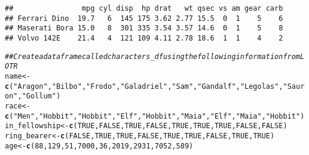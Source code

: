 \documentclass{article}\usepackage[]{graphicx}\usepackage[]{xcolor}
\makeatletter
\newcommand{\hlnum}[1]{\textcolor[rgb]{0.686,0.059,0.569}{#1}}%
\newcommand{\hlstr}[1]{\textcolor[rgb]{0.192,0.494,0.8}{#1}}%
\newcommand{\hlcom}[1]{\textcolor[rgb]{0.678,0.584,0.686}{\textit{#1}}}%
\newcommand{\hlstd}[1]{\textcolor[rgb]{0.345,0.345,0.345}{#1}}%
\newcommand{\hlkwb}[1]{\textcolor[rgb]{0.69,0.353,0.396}{#1}}%
\newcommand{\hlkwd}[1]{\textcolor[rgb]{0.737,0.353,0.396}{\textbf{#1}}}%
\newenvironment{kframe}{%
 \def\at@end@of@kframe{}%
 \ifinner\ifhmode%
  \def\at@end@of@kframe{\end{minipage}}%
  \begin{minipage}{\columnwidth}%
 \fi\fi%
 \def\FrameCommand##1{\hskip\@totalleftmargin \hskip-\fboxsep
 \colorbox{shadecolor}{##1}\hskip-\fboxsep
     \hskip-\linewidth \hskip-\@totalleftmargin \hskip\columnwidth}%
 \MakeFramed {\advance\hsize-\width
   \@totalleftmargin\z@ \linewidth\hsize
   \@setminipage}}%
 {\par\unskip\endMakeFramed%
 \at@end@of@kframe}
\newenvironment{knitrout}{}{} %
\makeatother
\begin{document}
\begin{knitrout}
\begin{kframe}
\begin{alltt}
\end{alltt}
\begin{verbatim}
##                mpg cyl disp  hp drat   wt qsec vs am gear carb
## Ferrari Dino  19.7   6  145 175 3.62 2.77 15.5  0  1    5    6
## Maserati Bora 15.0   8  301 335 3.54 3.57 14.6  0  1    5    8
## Volvo 142E    21.4   4  121 109 4.11 2.78 18.6  1  1    4    2
\end{verbatim}
\begin{alltt}
\hlcom{## Create a dataframe called characters_df using the following information from LOTR}
\hlstd{name} \hlkwb{<-} \hlkwd{c}\hlstd{(}\hlstr{"Aragon"}\hlstd{,} \hlstr{"Bilbo"}\hlstd{,} \hlstr{"Frodo"}\hlstd{,} \hlstr{"Galadriel"}\hlstd{,} \hlstr{"Sam"}\hlstd{,} \hlstr{"Gandalf"}\hlstd{,} \hlstr{"Legolas"}\hlstd{,} \hlstr{"Sauron"}\hlstd{,} \hlstr{"Gollum"}\hlstd{)}
\hlstd{race} \hlkwb{<-} \hlkwd{c}\hlstd{(}\hlstr{"Men"}\hlstd{,} \hlstr{"Hobbit"}\hlstd{,} \hlstr{"Hobbit"}\hlstd{,} \hlstr{"Elf"}\hlstd{,} \hlstr{"Hobbit"}\hlstd{,} \hlstr{"Maia"}\hlstd{,} \hlstr{"Elf"}\hlstd{,} \hlstr{"Maia"}\hlstd{,} \hlstr{"Hobbit"}\hlstd{)}
\hlstd{in_fellowship} \hlkwb{<-} \hlkwd{c}\hlstd{(}\hlnum{TRUE}\hlstd{,} \hlnum{FALSE}\hlstd{,} \hlnum{TRUE}\hlstd{,} \hlnum{FALSE}\hlstd{,} \hlnum{TRUE}\hlstd{,} \hlnum{TRUE}\hlstd{,} \hlnum{TRUE}\hlstd{,} \hlnum{FALSE}\hlstd{,} \hlnum{FALSE}\hlstd{)}
\hlstd{ring_bearer} \hlkwb{<-} \hlkwd{c}\hlstd{(}\hlnum{FALSE}\hlstd{,} \hlnum{TRUE}\hlstd{,} \hlnum{TRUE}\hlstd{,} \hlnum{FALSE}\hlstd{,} \hlnum{TRUE}\hlstd{,} \hlnum{TRUE}\hlstd{,} \hlnum{FALSE}\hlstd{,} \hlnum{TRUE}\hlstd{,} \hlnum{TRUE}\hlstd{)}
\hlstd{age} \hlkwb{<-} \hlkwd{c}\hlstd{(}\hlnum{88}\hlstd{,} \hlnum{129}\hlstd{,} \hlnum{51}\hlstd{,} \hlnum{7000}\hlstd{,} \hlnum{36}\hlstd{,} \hlnum{2019}\hlstd{,} \hlnum{2931}\hlstd{,} \hlnum{7052}\hlstd{,} \hlnum{589}\hlstd{)}


\end{alltt}
\end{kframe}
\end{knitrout}
\end{document}
